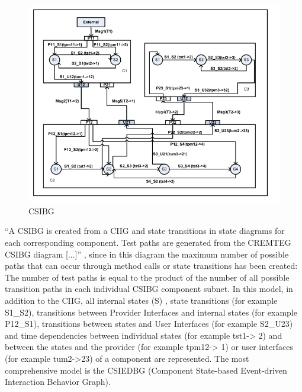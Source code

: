 \begin{figure}[H]
	\centering
	\includegraphics{../images/CSIBG} 
	\caption{CSIBG \cite{Guan2015}}
\end{figure}
\enquote{A CSIBG is created from a CIIG and state transitions
in state diagrams for each corresponding component. Test paths are
generated from the CREMTEG CSIBG diagram {[}...{]}} \cite{Guan2015},
since in this diagram the maximum number of possible paths that can
occur through method calls or state transitions has been created:
The number of test paths is equal to the product of the number of
all possible transition paths in each individual CSIBG component subnet.
In this model, in addition to the CIIG, all internal states (S) ,
state transitions (for example S1\_S2), transitions between Provider
Interfaces and internal states (for example P12\_S1), transitions
between states and User Interfaces (for example S2\_U23) and time
dependencies between individual states (for example tst1-\textgreater
2) and between the states and the provider (for example tpm12-\textgreater
1) or user interfaces (for example tum2-\textgreater 23) of a component
are represented. The most comprehensive model is the CSIEDBG (Component
State-based Event-driven Interaction Behavior Graph).


